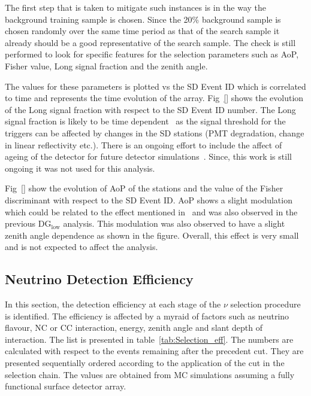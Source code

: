 The first step that is taken to mitigate such instances is in the way the background training sample is chosen. Since the 20\% background sample is chosen randomly over the same time period as that of the search sample it already should be a good representative of the search sample. The check is still performed to look for specific features for the selection parameters such as AoP, Fisher value, Long signal fraction and the zenith angle. 

The values for these parameters is plotted vs the SD Event ID which is correlated to time and represents the time evolution of the array. Fig~\ref{} shows the evolution of the Long signal fraction with respect to the SD Event ID number. The Long signal fraction is likely to be time dependent~\cite{Sato:2011zze} as the signal threshold for the triggers can be affected by changes in the SD stations (PMT degradation, change in linear reflectivity etc.). There is an ongoing effort to include the affect of ageing of the detector for future detector simulations~\cite{PierreAuger:2023xfj}. Since, this work is still ongoing it was not used for this analysis. 

Fig~\ref{} show the evolution of AoP of the stations and the value of the Fisher discriminant with respect to the SD Event ID. AoP shows a slight modulation which could be related to the effect mentioned in~\cite{Sato:2011zze} and was also observed in the previous DG$\mathrm{_{low}}$ analysis. This modulation was also observed to have a slight zenith angle dependence as shown in the figure. Overall, this effect is very small and is not expected to affect the analysis.

\subsection{Neutrino Detection Efficiency}
\label{subsec:nu_sel_nudeteff}

In this section, the detection efficiency at each stage of the $\nu$ selection procedure is identified. The efficiency is affected by a myraid of factors such as neutrino flavour, NC or CC interaction, energy, zenith angle and slant depth of interaction. The list is presented in table~\ref{tab:Selection_eff}. The numbers are calculated with respect to the events remaining after the precedent cut. They are presented sequentially ordered according to the application of the cut in the selection chain. The values are obtained from MC simulations assuming a fully functional surface detector array. 

